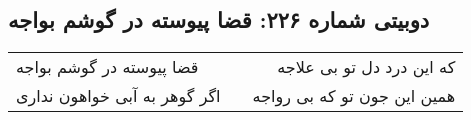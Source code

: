 \begin{center}
\section*{دوبیتی شماره ۲۲۶: قضا پیوسته در گوشم بواجه}
\label{sec:226}
\begin{longtable}{l p{0.5cm} r}
قضا پیوسته در گوشم بواجه
&&
که این درد دل تو بی علاجه
\\
اگر گوهر به آبی خواهون نداری
&&
همین این جون تو که بی رواجه
\\
\end{longtable}
\end{center}
